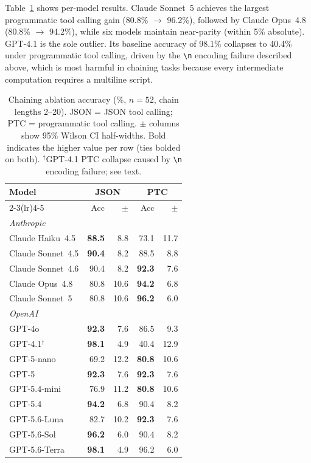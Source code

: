\documentclass[11pt]{article}
\newcommand{\codemode}{programmatic tool calling}
\begin{document}
Table~\ref{tab:chaining} shows per-model results.
Claude Sonnet~5 achieves the largest \codemode{} gain (80.8\% $\to$ 96.2\%), followed by Claude Opus~4.8 (80.8\% $\to$ 94.2\%), while six
models maintain near-parity (within 5\% absolute).
GPT-4.1 is the sole outlier. Its baseline accuracy of 98.1\% collapses to
40.4\% under \codemode{}, driven by the \texttt{\textbackslash n} encoding failure
described above, which is most harmful in chaining tasks because every
intermediate computation requires a multiline script.

\begin{table}[t]
\centering
\footnotesize
\setlength{\tabcolsep}{3pt}
\begin{tabular}{lrrrr}
\toprule
\textbf{Model} & \multicolumn{2}{c}{\textbf{JSON}} & \multicolumn{2}{c}{\textbf{PTC}} \\
\cmidrule(lr){2-3}\cmidrule(lr){4-5}
 & Acc & $\pm$ & Acc & $\pm$ \\
\midrule
\multicolumn{5}{l}{\textit{Anthropic}} \\
Claude Haiku~4.5  & \textbf{88.5} &  8.8 & 73.1 & 11.7 \\
Claude Sonnet~4.5 & \textbf{90.4} &  8.2 & 88.5 &  8.8 \\
Claude Sonnet~4.6 & 90.4 &  8.2 & \textbf{92.3} &  7.6 \\
Claude Opus~4.8   & 80.8 & 10.6 & \textbf{94.2} &  6.8 \\
Claude Sonnet~5   & 80.8 & 10.6 & \textbf{96.2} &  6.0 \\
\midrule
\multicolumn{5}{l}{\textit{OpenAI}} \\
GPT-4o            & \textbf{92.3} &  7.6 & 86.5 &  9.3 \\
GPT-4.1$^\dagger$ & \textbf{98.1} &  4.9 & 40.4 & 12.9 \\
GPT-5-nano        & 69.2 & 12.2 & \textbf{80.8} & 10.6 \\
GPT-5             & \textbf{92.3} &  7.6 & \textbf{92.3} &  7.6 \\
GPT-5.4-mini      & 76.9 & 11.2 & \textbf{80.8} & 10.6 \\
GPT-5.4           & \textbf{94.2} &  6.8 & 90.4 &  8.2 \\
GPT-5.6-Luna      & 82.7 & 10.2 & \textbf{92.3} &  7.6 \\
GPT-5.6-Sol       & \textbf{96.2} &  6.0 & 90.4 &  8.2 \\
GPT-5.6-Terra     & \textbf{98.1} &  4.9 & 96.2 &  6.0 \\
\bottomrule
\end{tabular}
\caption{Chaining ablation accuracy (\%, $n=52$, chain lengths 2--20).
JSON = JSON tool calling; PTC = programmatic tool calling.
$\pm$ columns show 95\% Wilson CI half-widths. Bold indicates the higher
value per row (ties bolded on both).
$^\dagger$GPT-4.1 PTC collapse caused by \texttt{\textbackslash n} encoding
failure; see text.}
\label{tab:chaining}
\end{table}
\end{document}
